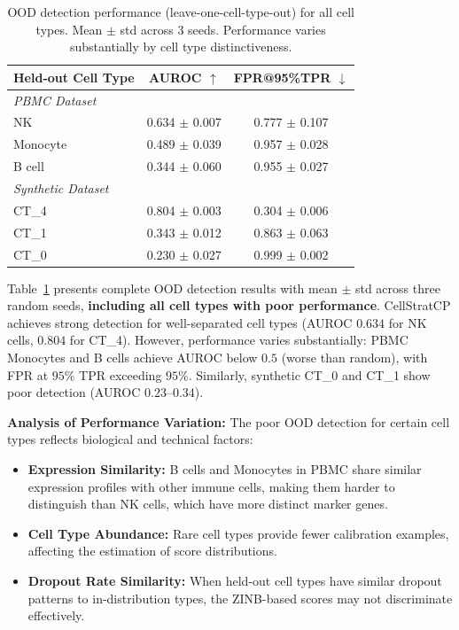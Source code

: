 \documentclass{article}
\begin{document}
\begin{table}[t]
\caption{OOD detection performance (leave-one-cell-type-out) for all cell types. Mean $\pm$ std across 3 seeds. Performance varies substantially by cell type distinctiveness.}
\label{tab:ood}
\centering
\begin{tabular}{lcc}
\toprule
Held-out Cell Type & AUROC $\uparrow$ & FPR@95\%TPR $\downarrow$ \\
\midrule
\multicolumn{3}{l}{\textit{PBMC Dataset}} \\
NK & 0.634 $\pm$ 0.007 & 0.777 $\pm$ 0.107 \\
Monocyte & 0.489 $\pm$ 0.039 & 0.957 $\pm$ 0.028 \\
B cell & 0.344 $\pm$ 0.060 & 0.955 $\pm$ 0.027 \\
\midrule
\multicolumn{3}{l}{\textit{Synthetic Dataset}} \\
CT\_4 & 0.804 $\pm$ 0.003 & 0.304 $\pm$ 0.006 \\
CT\_1 & 0.343 $\pm$ 0.012 & 0.863 $\pm$ 0.063 \\
CT\_0 & 0.230 $\pm$ 0.027 & 0.999 $\pm$ 0.002 \\
\bottomrule
\end{tabular}
\end{table}

Table~\ref{tab:ood} presents complete OOD detection results with mean $\pm$ std across three random seeds, \textbf{including all cell types with poor performance}. CellStratCP achieves strong detection for well-separated cell types (AUROC $0.634$ for NK cells, $0.804$ for CT\_4). However, performance varies substantially: PBMC Monocytes and B cells achieve AUROC below $0.5$ (worse than random), with FPR at $95\%$ TPR exceeding $95\%$. Similarly, synthetic CT\_0 and CT\_1 show poor detection (AUROC $0.23$--$0.34$).

\textbf{Analysis of Performance Variation:} The poor OOD detection for certain cell types reflects biological and technical factors:
\begin{itemize}
    \item \textbf{Expression Similarity:} B cells and Monocytes in PBMC share similar expression profiles with other immune cells, making them harder to distinguish than NK cells, which have more distinct marker genes.
    \item \textbf{Cell Type Abundance:} Rare cell types provide fewer calibration examples, affecting the estimation of score distributions.
    \item \textbf{Dropout Rate Similarity:} When held-out cell types have similar dropout patterns to in-distribution types, the ZINB-based scores may not discriminate effectively.
\end{itemize}
\end{document}

